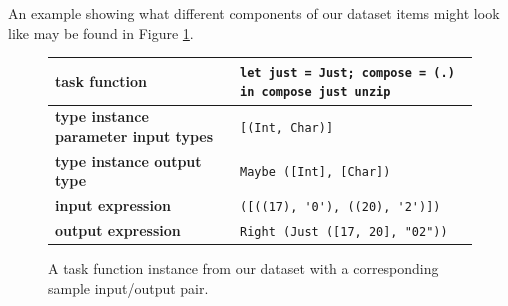 \documentclass{article}
\begin{document}
An example showing what different components of our dataset items might look like may be found in Figure \ref{fig:datasample}.

\begin{figure}
    \begin{tabular}{|l|l|} \hline
        \textbf{task function} & \verb|let just = Just; compose = (.) in compose just unzip| \\ \hline
        \textbf{type instance parameter input types} & \verb|[(Int, Char)]| \\ \hline
        \textbf{type instance output type} & \verb|Maybe ([Int], [Char])| \\ \hline
        \textbf{input expression} & \verb|([((17), '0'), ((20), '2')])| \\ \hline
        \textbf{output expression} & \verb|Right (Just ([17, 20], "02"))| \\ \hline
    \end{tabular}
    \caption{A task function instance from our dataset with a corresponding sample input/output pair.}
    \label{fig:datasample}
\end{figure}
\end{document}

